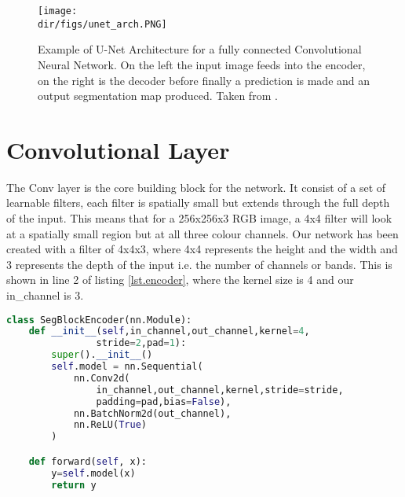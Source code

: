 \begin{figure}[htbp]
    \centering
    \texttt{[image: \\dir/figs/unet\_arch.PNG]}
    \caption[Example of U-Net Architecture for a fully connected Convolutional Neural Network]{Example of U-Net Architecture for a fully connected Convolutional Neural Network. On the left the input image feeds into the encoder, on the right is the decoder before finally a prediction is made and an output segmentation map produced. Taken from \citet{ronneberger15}.}
    \label{fig.u-net_arch}
\end{figure}

\section{Convolutional Layer}
The Conv layer is the core building block for the network. It consist of a set of learnable filters, each filter is spatially small but extends through the full depth of the input. This means that for a 256x256x3 RGB image, a 4x4 filter will look at a spatially small region but at all three colour channels. Our network has been created with a filter of 4x4x3, where 4x4 represents the height and the width and 3 represents the depth of the input i.e. the number of channels or bands. This is shown in line 2 of listing \ref{lst.encoder}, where the kernel size is 4 and our in\_channel is 3. \par
\begin{lstlisting}[language=Python, caption = {Encoder architecture, performs the convolution on the input volume at each layer in the CNN. Input is a 3D volume of depth, height and width, where the initial depth is the number of channels in the input image. The encoder convolves the data by passing a moving filter of size 4x4, with a stride of 2 and a zero padding of 1, then a batch normalisation is performed and finally an activation function is applied.}, label={lst.encoder},float,floatplacement=htbp]
class SegBlockEncoder(nn.Module):
    def __init__(self,in_channel,out_channel,kernel=4,
                stride=2,pad=1):
        super().__init__()
        self.model = nn.Sequential(
            nn.Conv2d(
                in_channel,out_channel,kernel,stride=stride,
                padding=pad,bias=False),
            nn.BatchNorm2d(out_channel),
            nn.ReLU(True)
        )

    def forward(self, x):
        y=self.model(x)
        return y
\end{lstlisting}
